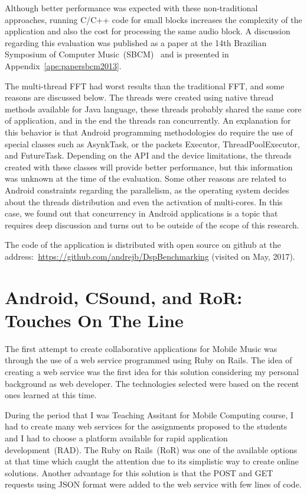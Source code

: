 Although better performance was expected with these non-traditional approaches, running C/C++ code for small blocks increases the complexity of the application and also the cost for processing the same audio block.
A discussion regarding this evaluation was published as a paper at the 14th Brazilian Symposium of Computer Music~(SBCM)~\citep{deCarvalhoJunior2013fftbenchmark} and is presented in Appendix~\ref{ape:papersbcm2013}.

The multi-thread FFT had worst results than the traditional FFT, and some reasons are discussed below.
The threads were created using native thread methods available for Java language, these threads probably shared the same core of application, and in the end the threads ran concurrently.
An explanation for this behavior is that Android programming methodologies do require the use of special classes such as AsynkTask, or the packets Executor, ThreadPoolExecutor, and FutureTask.
Depending on the API and the device limitations, the threads created with these classes will provide better performance, but this information was unknown at the time of the evaluation.
Some other reasons are related to Android constraints regarding the parallelism, as the operating system decides about the threads distribution and even the activation of multi-cores.
In this case, we found out that concurrency in Android applications is a topic that requires deep discussion and turns out to be outside of the scope of this research.

The code of the application is distributed with open source on github at the address:~\url{https://github.com/andrejb/DspBenchmarking} (visited on May, 2017).

\section{Android, CSound, and RoR: Touches On The Line}
\label{apesec:apptouchesontheline}

The first attempt to create collaborative applications for Mobile Music was through the use of a web service programmed using Ruby on Rails.
The idea of creating a web service was the first idea for this solution considering my personal background as web developer.
The technologies selected were based on the recent ones learned at this time.

During the period that I was Teaching Assitant for Mobile Computing course, I had to create many web services for the assignments proposed to the students and I had to choose a platform available for rapid application development~(RAD).
The Ruby on Rails~(RoR) was one of the available options at that time which caught the attention due to its simplistic way to create online solutions.
Another advantage for this solution is that the POST and GET requests using JSON format were added to the web service with few lines of code.

